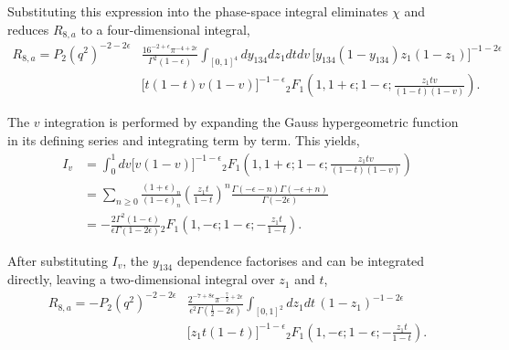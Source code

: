Substituting this expression into the phase-space integral eliminates $\chi$ and reduces
$R_{8,a}$ to a four-dimensional integral,
\begin{equation}
    \begin{split}
        R_{8,a} = P_2\!\left(q^2\right)^{-2-2\epsilon}&\frac{16^{-2+\epsilon}\pi^{-4+2\epsilon}}{\Gamma^2(1-\epsilon)}\int_{[0,1]^4}dy_{134}dz_1dtdv\,\Big[y_{134}(1-y_{134})z_1(1-z_1)\Big]^{-1-2\epsilon}\\
                                                      &\Big[t(1-t)v(1-v)\Big]^{-1-\epsilon}{}_2F_1\!\left(1,1+\epsilon;1-\epsilon;\frac{z_1tv}{(1-t)(1-v)}\right).
    \end{split}
\end{equation}

The $v$ integration is performed by expanding the Gauss hypergeometric function in its defining
series and integrating term by term. This yields,
\begin{equation}
    \begin{split}
        I_v &= \int_0^1 dv \Big[v(1-v)\Big]^{-1-\epsilon}{}_2F_1\!\left(1,1+\epsilon;1-\epsilon;\frac{z_1tv}{(1-t)(1-v)}\right)\\
            &= \sum_{n\geq0}\frac{(1+\epsilon)_n}{(1-\epsilon)_n}\!\left(\frac{z_1t}{1-t}\right)^n\frac{\Gamma(-\epsilon-n)\Gamma(-\epsilon+n)}{\Gamma(-2\epsilon)}\\
            &= -\frac{2\Gamma^2(1-\epsilon)}{\epsilon\Gamma(1-2\epsilon)}{}_2F_1\!\left(1,-\epsilon;1-\epsilon;-\frac{z_1t}{1-t}\right).
    \end{split}
\end{equation}

After substituting $I_v$, the $y_{134}$ dependence factorises and can be integrated directly,
leaving a two-dimensional integral over $z_1$ and $t$,
\begin{equation}
    \begin{split}
        R_{8,a} = -P_2\!\left(q^2\right)^{-2-2\epsilon}&\frac{2^{-7+8\epsilon}\pi^{-\frac72+2\epsilon}}{\epsilon^2\Gamma\!\left(\frac12-2\epsilon\right)}\int_{[0,1]^2}dz_1dt\,(1-z_1)^{-1-2\epsilon}\\
                                                       &\Big[z_1t(1-t)\Big]^{-1-\epsilon}{}_2F_1\!\left(1,-\epsilon;1-\epsilon;-\frac{z_1t}{1-t}\right).
    \end{split}
\end{equation}

